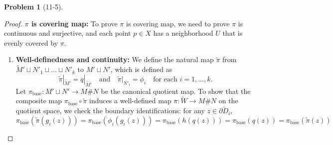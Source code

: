\documentclass[11pt, a4paper]{article}
\theoremstyle{definition}
\newtheorem{prob}{Problem}
\newenvironment{problem}[1][]{\begin{prob}[#1]\normalfont}{\end{prob}\vspace{1.5em}}
\begin{document}
\begin{problem}[11-5]
\begin{proof}
    \item[$4^ \circ$] \textbf{$\pi$ is covering map:} 
    To prove $\pi$ is covering map, we need to prove $\pi$ is continuous and surjective, and each point $p \in X$ has 
    a neighborhood $U$ that is evenly covered by $\pi$. 
    \begin{enumerate}
        \item \textbf{Well-definedness and continuity:} We define the natural map 
        $\widetilde{\pi}$ from $\widetilde{M}' \sqcup N'_1 \sqcup \dots \sqcup N'_k$ to $M' \sqcup N'$, which is 
        defined as 
        $$\widetilde{\pi}|_{\widetilde{M}'} = q|_{\widetilde{M}'} \quad \text{and} \quad \widetilde{\pi}|_{N'_i} = \phi_i \quad \text{for each } i = 1, \dots, k.$$
        Let $\pi_{\text{base}} : M' \sqcup N' \to M \# N$ be the canonical quotient map. To show that the composite 
        map $\pi_{\text{base}} \circ \widetilde{\pi}$ induces a well-defined map $\pi : \widetilde{W} \to M \# N$ on 
        the quotient space, we check the boundary identifications: for any $z \in \partial \widetilde{D}_i$,
        $$\pi_{\text{base}} \left( \widetilde{\pi}(g_i(z)) \right) = \pi_{\text{base}} \left( \phi_i(g_i(z)) \right) = \pi_{\text{base}} \left( h(q(z)) \right) = \pi_{\text{base}} \left( q(z) \right) = \pi_{\text{base}} \left( \widetilde{\pi}(z) \right)$$

\end{enumerate}
\end{proof}
\end{problem}
\end{document}
